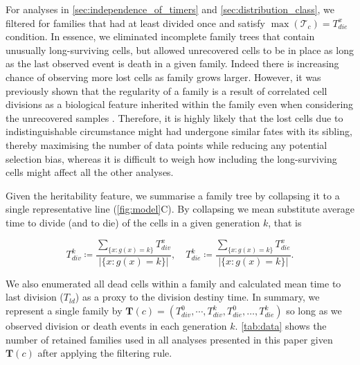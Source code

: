 \documentclass[11pt, a4paper]{article}
\begin{document}
For analyses in \cref{sec:independence_of_timers} and \cref{sec:distribution_class}, we filtered for families that had at least divided once and satisfy $\max(\mathcal{T}_c) = T_{die}^x$ condition. In essence, we eliminated incomplete family trees that contain unusually long-surviving cells, but allowed unrecovered cells to be in place as long as the last observed event is death in a given family. Indeed there is increasing chance of observing more lost cells as family grows larger. However, it was previously shown that the regularity of a family is a result of correlated cell divisions as a biological feature inherited within the family even when considering the unrecovered samples \parencite{Marchingo.2016}. Therefore, it is highly likely that the lost cells due to indistinguishable circumstance might had undergone similar fates with its sibling, thereby maximising the number of data points while reducing any potential selection bias, whereas it is difficult to weigh how including the long-surviving cells might affect all the other analyses.

Given the heritability feature, we summarise a family tree by collapsing it to a single representative line (\cref{fig:model}C). By collapsing we mean substitute average time to divide (and to die) of the cells in a given generation $k$, that is
\begin{linenomath*}
    \begin{equation*}
        T_{div}^k \coloneqq \frac{\sum_{\{x:g(x)=k\}}T_{div}^x}{|\{x:g(x)=k\}|}, \quad T_{die}^k \coloneqq \frac{\sum_{\{x:g(x)=k\}}T_{die}^x}{|\{x:g(x)=k\}|}.
    \end{equation*}
\end{linenomath*}
We also enumerated all dead cells within a family and calculated mean time to last division ($T_{ld}$) as a proxy to the division destiny time. In summary, we represent a single family by $\mathbf{T}(c) = (T_{div}^0, \cdots, T_{div}^k, T_{die}^0, \dots, T_{die}^k)$ so long as we observed division or death events in each generation $k$.  \cref{tab:data} shows the number of retained families used in all analyses presented in this paper given $\mathbf{T}(c)$ after applying the filtering rule.

\nolinenumbers
\end{document}
